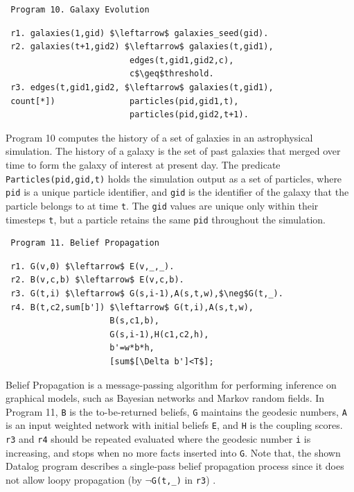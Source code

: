 \begin{appendix}
 \begin{verbatim}
 Program 10. Galaxy Evolution
 \end{verbatim}\small
 \begin{lstlisting}
 r1. galaxies(1,gid) $\leftarrow$ galaxies_seed(gid).
 r2. galaxies(t+1,gid2) $\leftarrow$ galaxies(t,gid1),
                         edges(t,gid1,gid2,c),
                         c$\geq$threshold.
 r3. edges(t,gid1,gid2, $\leftarrow$ galaxies(t,gid1),
 count[*])               particles(pid,gid1,t),
                         particles(pid,gid2,t+1).
 \end{lstlisting}
 \normalsize
 
 Program 10 \cite{Wang:2015:AFR:2824032.2824052} computes the history of a set of galaxies in an astrophysical simulation. The history of a galaxy is the set of past galaxies that merged over time to form the galaxy of interest at present day. The predicate \texttt{Particles(pid,gid,t)} holds the simulation output as a set of particles, where \texttt{pid} is a unique particle identifier, and \texttt{gid} is the identifier of the galaxy that the particle belongs to at time \texttt{t}. The \texttt{gid} values are unique only within their timesteps \texttt{t}, but a particle retains the same \texttt{pid} throughout the simulation.
 
 
 \begin{verbatim}
 Program 11. Belief Propagation
 \end{verbatim}\small
 \begin{lstlisting}
 r1. G(v,0) $\leftarrow$ E(v,_,_).
 r2. B(v,c,b) $\leftarrow$ E(v,c,b).
 r3. G(t,i) $\leftarrow$ G(s,i-1),A(s,t,w),$\neg$G(t,_).
 r4. B(t,c2,sum[b']) $\leftarrow$ G(t,i),A(s,t,w),
                     B(s,c1,b),
                     G(s,i-1),H(c1,c2,h),
                     b'=w*b*h,
                     [sum$[\Delta b']<T$];
 \end{lstlisting}
 \normalsize
 
 Belief Propagation \cite{910572} is a message-passing algorithm for performing inference on graphical models, such as Bayesian networks and Markov random fields. In Program 11, \texttt{B} is the to-be-returned beliefs, \texttt{G} maintains the geodesic numbers, \texttt{A} is an input weighted network with initial beliefs \texttt{E}, and \texttt{H} is the coupling scores. \texttt{r3} and \texttt{r4} should be repeated evaluated where the geodesic number \texttt{i} is increasing, and stops when no more facts inserted into \texttt{G}. Note that, the shown Datalog program describes a single-pass belief propagation process since it does not allow loopy propagation (by $\neg$\texttt{G(t,\_)} in \texttt{r3}) \cite{Gatterbauer:2015:LSB:2735479.2735490}.
 

\end{appendix}
